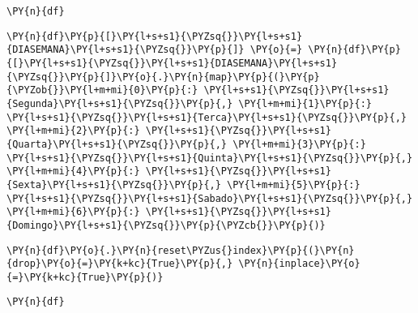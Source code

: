     \begin{tcolorbox}[breakable, size=fbox, boxrule=1pt, pad at break*=1mm,colback=cellbackground, colframe=cellborder]
\begin{Verbatim}[commandchars=\\\{\}]
\PY{n}{df}
\end{Verbatim}
\end{tcolorbox}

    \begin{tcolorbox}[breakable, size=fbox, boxrule=1pt, pad at break*=1mm,colback=cellbackground, colframe=cellborder]
\begin{Verbatim}[commandchars=\\\{\}]
\PY{n}{df}\PY{p}{[}\PY{l+s+s1}{\PYZsq{}}\PY{l+s+s1}{DIASEMANA}\PY{l+s+s1}{\PYZsq{}}\PY{p}{]} \PY{o}{=} \PY{n}{df}\PY{p}{[}\PY{l+s+s1}{\PYZsq{}}\PY{l+s+s1}{DIASEMANA}\PY{l+s+s1}{\PYZsq{}}\PY{p}{]}\PY{o}{.}\PY{n}{map}\PY{p}{(}\PY{p}{\PYZob{}}\PY{l+m+mi}{0}\PY{p}{:} \PY{l+s+s1}{\PYZsq{}}\PY{l+s+s1}{Segunda}\PY{l+s+s1}{\PYZsq{}}\PY{p}{,} \PY{l+m+mi}{1}\PY{p}{:} \PY{l+s+s1}{\PYZsq{}}\PY{l+s+s1}{Terca}\PY{l+s+s1}{\PYZsq{}}\PY{p}{,} \PY{l+m+mi}{2}\PY{p}{:} \PY{l+s+s1}{\PYZsq{}}\PY{l+s+s1}{Quarta}\PY{l+s+s1}{\PYZsq{}}\PY{p}{,} \PY{l+m+mi}{3}\PY{p}{:} \PY{l+s+s1}{\PYZsq{}}\PY{l+s+s1}{Quinta}\PY{l+s+s1}{\PYZsq{}}\PY{p}{,} \PY{l+m+mi}{4}\PY{p}{:} \PY{l+s+s1}{\PYZsq{}}\PY{l+s+s1}{Sexta}\PY{l+s+s1}{\PYZsq{}}\PY{p}{,} \PY{l+m+mi}{5}\PY{p}{:} \PY{l+s+s1}{\PYZsq{}}\PY{l+s+s1}{Sabado}\PY{l+s+s1}{\PYZsq{}}\PY{p}{,} \PY{l+m+mi}{6}\PY{p}{:} \PY{l+s+s1}{\PYZsq{}}\PY{l+s+s1}{Domingo}\PY{l+s+s1}{\PYZsq{}}\PY{p}{\PYZcb{}}\PY{p}{)}
\end{Verbatim}
\end{tcolorbox}

    \begin{tcolorbox}[breakable, size=fbox, boxrule=1pt, pad at break*=1mm,colback=cellbackground, colframe=cellborder]
\begin{Verbatim}[commandchars=\\\{\}]
\PY{n}{df}\PY{o}{.}\PY{n}{reset\PYZus{}index}\PY{p}{(}\PY{n}{drop}\PY{o}{=}\PY{k+kc}{True}\PY{p}{,} \PY{n}{inplace}\PY{o}{=}\PY{k+kc}{True}\PY{p}{)}
\end{Verbatim}
\end{tcolorbox}

    \begin{tcolorbox}[breakable, size=fbox, boxrule=1pt, pad at break*=1mm,colback=cellbackground, colframe=cellborder]
\begin{Verbatim}[commandchars=\\\{\}]
\PY{n}{df}
\end{Verbatim}
\end{tcolorbox}

